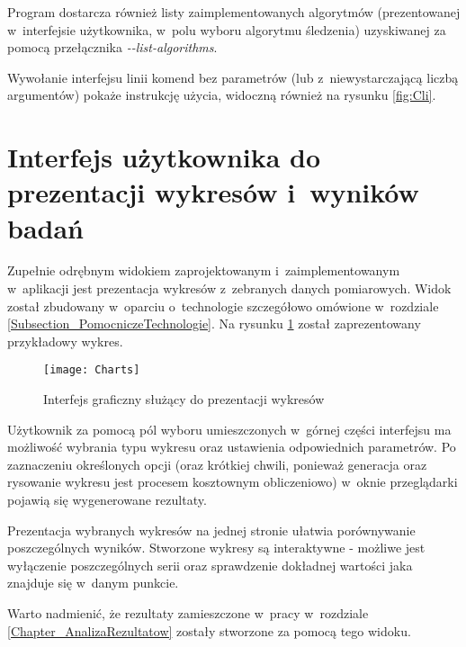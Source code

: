     Program dostarcza również listy zaimplementowanych algorytmów (prezentowanej w~interfejsie użytkownika, w~polu wyboru algorytmu śledzenia) uzyskiwanej za pomocą przełącznika \textit{-{}-list-algorithms}.

    Wywołanie interfejsu linii komend bez parametrów (lub z~niewystarczającą liczbą argumentów) pokaże instrukcję użycia, widoczną również na rysunku \ref{fig:Cli}.

  \section{Interfejs użytkownika do prezentacji wykresów i~wyników badań}

    Zupełnie odrębnym widokiem zaprojektowanym i~zaimplementowanym w~aplikacji jest prezentacja wykresów z~zebranych danych pomiarowych. Widok został zbudowany w~oparciu o~technologie szczegółowo omówione w~rozdziale \ref{Subsection_PomocniczeTechnologie}. Na rysunku \ref{fig:Charts} został zaprezentowany przykładowy wykres.

    \newpage
    \begin{figure}[!ht]
      \centering
      \texttt{[image: Charts]}
      \caption[Interfejs graficzny służący do prezentacji wykresów]{Interfejs graficzny służący do prezentacji wykresów}
      \label{fig:Charts}
    \end{figure}

    Użytkownik za pomocą pól wyboru umieszczonych w~górnej części interfejsu ma możliwość wybrania typu wykresu oraz ustawienia odpowiednich parametrów. Po zaznaczeniu określonych opcji (oraz krótkiej chwili, ponieważ generacja oraz rysowanie wykresu jest procesem kosztownym obliczeniowo) w~oknie przeglądarki pojawią się wygenerowane rezultaty.

    Prezentacja wybranych wykresów na jednej stronie ułatwia porównywanie poszczególnych wyników. Stworzone wykresy są interaktywne - możliwe jest wyłączenie poszczególnych serii oraz sprawdzenie dokładnej wartości jaka znajduje się w~danym punkcie.

    Warto nadmienić, że rezultaty zamieszczone w~pracy w~rozdziale \ref{Chapter_AnalizaRezultatow} zostały stworzone za pomocą tego widoku.